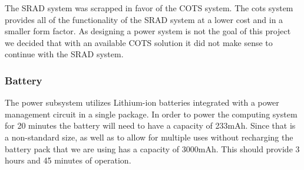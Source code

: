 The SRAD system was scrapped in favor of the COTS system. The cots system provides all of the functionality of the SRAD system at a lower cost and in a smaller form factor. As designing a power system is not the goal of this project we decided that with an available COTS solution it did not make sense to continue with the SRAD system.

\subsubsection{Battery}
The power subsystem utilizes Lithium-ion batteries integrated with a power management circuit in a single package. In order to
power the computing system for 20 minutes the battery will need to have a capacity of 233mAh. Since that is a non-standard size, as well as to allow for multiple uses without recharging the battery pack that we are using has a capacity of 3000mAh. This should provide 3 hours and 45 minutes of operation.

